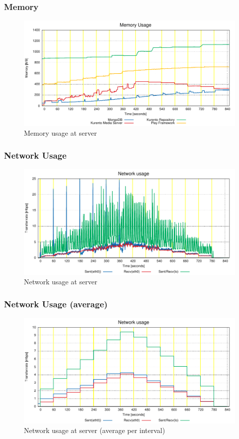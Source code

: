 \documentclass[compress]{beamer}
\begin{document}
	\begin{frame}[c]
		\frametitle{Memory}
		\begin{figure}[H]
			\includegraphics[width=\textwidth]{figures/ram.pdf}
			\caption{Memory usage at server}
		\end{figure}
	\end{frame}
	\begin{frame}[c]
		\frametitle{Network Usage}
		\begin{figure}[H]
			\includegraphics[width=\textwidth]{figures/net.pdf}
			\caption{Network usage at server}
		\end{figure}
	\end{frame}
	\begin{frame}[c]
		\frametitle{Network Usage (average)}
		\begin{figure}[H]
			\includegraphics[width=\textwidth]{figures/net_avg.pdf}
			\caption{Network usage at server (average per interval)}
		\end{figure}
	\end{frame}
\end{document}
